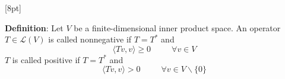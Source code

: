 \documentclass{article}
\begin{document}
[8pt]
\begin{definition}[frametitle={Positive and Nonnegative Operators}]
	
\textbf{Definition}: Let $V$ be a finite-dimensional inner product space. An operator $T \in \mathcal{L}(V)$ is called nonnegative if $T = T^{*}$ and 
\begin{equation*}
	\langle Tv,v \rangle \geq 0 \hspace{30pt} \forall v \in V
\end{equation*}
$T$ is called positive if $T = T^{*}$ and 
\begin{equation*}
	\langle Tv,v \rangle > 0 \hspace{30pt}  \forall v \in V\backslash \{0\}
\end{equation*}
\end{definition}
\end{document}
